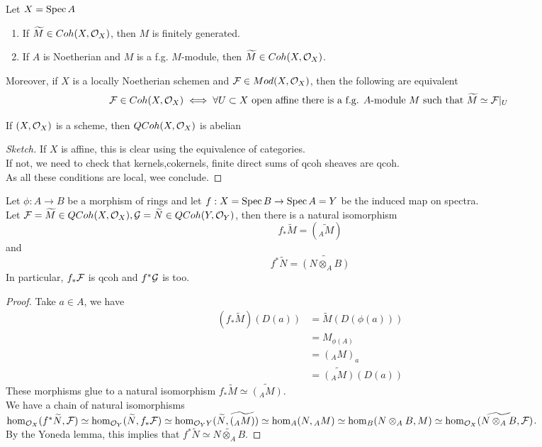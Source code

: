 \documentclass[../main.tex]{subfiles}
\begin{document}
\begin{rmq}
Let $X=\operatorname{Spec} A$ 
\begin{enumerate}
\item If $\widetilde M \in Coh( X,\mathcal{O}_X) $, then $M$ is finitely generated.\\
\item If $A$ is Noetherian and $M$ is a f.g. $M$-module, then $\widetilde{M} \in Coh( X,\mathcal{O}_X) $.
\end{enumerate}
\end{rmq}
Moreover, if $X$ is a locally Noetherian schemen and $\mathcal{F} \in Mod( X,\mathcal{O}_X) $, then the following are equivalent
\[ 
	\mathcal{F} \in Coh( X,\mathcal{O}_X) \iff \forall U \subset X \text{ open affine there is a f.g. $A$-module $M$ such that $ \widetilde{M} \simeq \mathcal{F}|_U$  } 
\]

\begin{crly}
If $( X,\mathcal{O}_X) $ is a scheme, then $QCoh( X,\mathcal{O}_X) $ is abelian
\end{crly}
\begin{proof}[Sketch]
If $X$ is affine, this is clear using the equivalence of categories.\\
If not, we need to check that kernels,cokernels, finite direct sums of qcoh sheaves are qcoh.\\
As all these conditions are local, wee conclude.
\end{proof}
\begin{propo}
Let $\phi:A\to B$ be a morphism of rings and let $f:X= \operatorname{Spec} B \to \operatorname{Spec} A=Y$ be the induced map on spectra.\\
Let $\mathcal{F}= \widetilde{M}\in QCoh( X,\mathcal{O}_X), \mathcal{G} = \widetilde{N} \in QCoh( Y,\mathcal{O}_Y)  $, then there is a natural isomorphism
\[ 
	f_\ast \widetilde M = ( \widetilde{{ }_A M}) 
\]
and
\[ 
f^{\ast}\widetilde N = \widetilde { ( N\otimes_A B) } 
\]
In particular, $f_\ast \mathcal{F}$ is qcoh and $f^{\ast}\mathcal{G}$ is too.

\end{propo}
\begin{proof}
Take $a\in A$, we have
\begin{align*}
	( f_\ast \tilde M) ( D( a) ) &= \widetilde{M} ( D( \phi( a) ) ) \\
	&= M_{\phi( A) } \\
	&= ( { }_A M)_a\\
	&= \widetilde{( { }_A M) } ( D( a) ) 
\end{align*}
These morphisms glue to a natural isomorphism $f_\ast \widetilde M \simeq \widetilde{( { }_A M)}  $.\\
We have a chain of natural isomorphisms $\hom_{\mathcal{O}_X} ( f^{\ast}\widetilde N , \mathcal{F}) \simeq \hom_{\mathcal{O}_Y} ( \widetilde N, f_\ast \mathcal{F}) \simeq \hom_{\mathcal{O}_YY} ( \widetilde N, \widetilde{( { }_A M )} )\simeq \hom_A ( N, { }_A M) \simeq \hom_B( N\otimes_A B ,M) \simeq \hom_{\mathcal{O}_X} ( \widetilde{N\otimes_A B}, \mathcal{F})  $.\\
By the Yoneda lemma, this implies that $f^{\ast}\widetilde{N} \simeq \widetilde{N\otimes_A B}$.
\end{proof}
\end{document}
